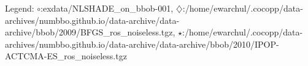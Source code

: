 Legend: {\color{CornflowerBlue}$\circ$}:exdata/NLSHADE\_on\_bbob-001, {\color{Orange}$\diamondsuit$}:/home/ewarchul/.cocopp/data-archives/numbbo.github.io/data-archive/data-archive/bbob/2009/BFGS\_ros\_noiseless.tgz, {\color{Green}$\star$}:/home/ewarchul/.cocopp/data-archives/numbbo.github.io/data-archive/data-archive/bbob/2010/IPOP-ACTCMA-ES\_ros\_noiseless.tgz